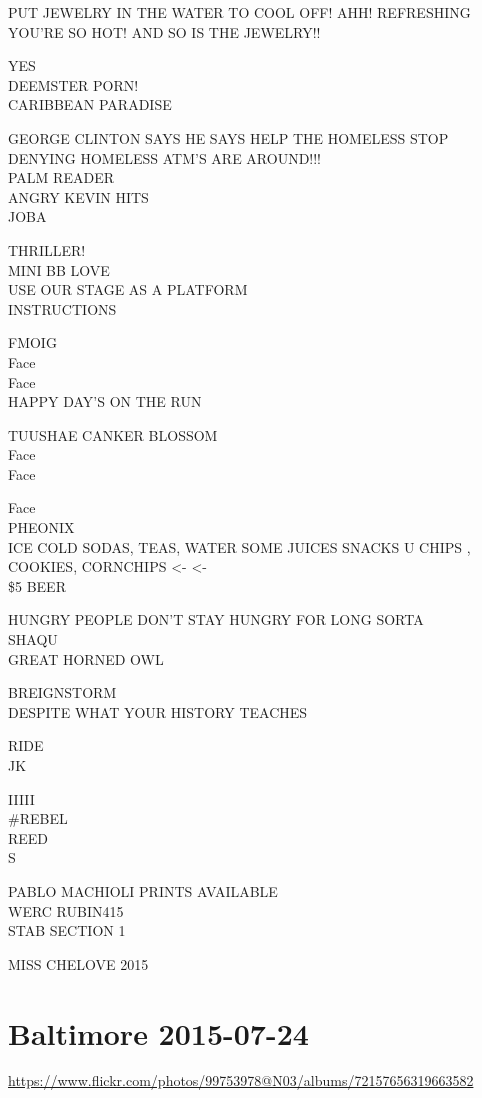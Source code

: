 \documentclass[10pt,letterpaper]{article}
\begin{document}
PUT JEWELRY IN THE WATER TO COOL OFF!  AHH!  REFRESHING\\
YOU'RE SO HOT!  AND SO IS THE JEWELRY!!

YES\\
DEEMSTER PORN!\\
CARIBBEAN PARADISE

GEORGE CLINTON SAYS HE SAYS HELP THE HOMELESS STOP DENYING HOMELESS ATM'S ARE AROUND!!!\\
PALM READER\\
ANGRY KEVIN HITS\\
JOBA

THRILLER!\\
MINI BB LOVE\\
USE OUR STAGE AS A PLATFORM\\
INSTRUCTIONS

FMOIG\\
Face\\
Face\\
HAPPY DAY'S ON THE RUN

TUUSHAE CANKER BLOSSOM\\
Face\\
Face

Face\\
PHEONIX\\
ICE COLD SODAS, TEAS, WATER SOME JUICES SNACKS U CHIPS , COOKIES, CORNCHIPS <{-} <{-}\\
\$5 BEER

HUNGRY PEOPLE DON'T STAY HUNGRY FOR LONG SORTA\\
SHAQU\\
GREAT HORNED OWL

BREIGNSTORM\\
DESPITE WHAT YOUR HISTORY TEACHES

RIDE\\
JK

IIIII\\
\#REBEL\\
REED\\
S

PABLO MACHIOLI PRINTS AVAILABLE\\
WERC RUBIN415\\
STAB SECTION 1

MISS CHELOVE 2015
\pagebreak

\section*{Baltimore 2015-07-24}

\url{https://www.flickr.com/photos/99753978@N03/albums/72157656319663582}
\end{document}
